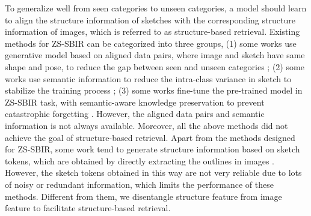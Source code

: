 \documentclass[10pt,twocolumn,letterpaper]{article}
\begin{document}
To generalize well from seen categories to unseen categories, a model should learn to align  the structure information of sketches with the corresponding structure information of images, which is referred to as structure-based retrieval.  
Existing methods for ZS-SBIR can be categorized into three groups, 
(1) some works use generative model based on aligned data pairs, where image and sketch have same shape and pose, to reduce the gap between seen and unseen categories \cite{yelamarthi2018zero}; 
(2) some works use semantic information to reduce the intra-class variance in sketch to stabilize the training process \cite{xu2019semantic, wang2019stacked, dutta2019semantically, shen2018zero}; 
(3) some works fine-tune the pre-trained model in ZS-SBIR task, with semantic-aware knowledge preservation to prevent catastrophic forgetting \cite{liu2019semantic}. 
However, the aligned data pairs and semantic information is not always available. Moreover, all the above methods did not achieve the goal of structure-based retrieval. 
Apart from the methods designed for ZS-SBIR, some work tend to generate structure information based on sketch tokens, which are obtained by directly extracting the outlines in images \cite{liu2017deep, wang2015sketch, yu2016sketch}. However, the sketch tokens obtained in this way are not very reliable due to lots of noisy or redundant information, which limits the performance of these methods.
Different from them, we disentangle structure feature from image feature to facilitate structure-based retrieval.
\end{document}
